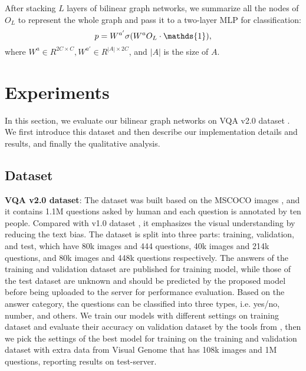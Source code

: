 \documentclass[10pt,twocolumn,letterpaper]{article}
\begin{document}
After stacking $L$ layers of bilinear graph networks, we summarize all the nodes of $O_{L}$ to represent the whole graph and pass it to a two-layer MLP for classification:
\vspace{-5pt}
\begin{equation}
p = W^{a'}\sigma(W^a O_{L} \cdot \mathds{1}),
\vspace{-5pt}
\end{equation}
where $W^a \in R^{2C \times C}, W^{a'} \in R^{|A|\times 2C}$, and $|A|$ is the size of $A$.

\section{Experiments}
In this section, we evaluate our bilinear graph networks on VQA v2.0 dataset \cite{antol2015vqa, goyal2017making}. We first introduce this dataset and then describe our implementation details and results, and finally the qualitative analysis. 

\subsection{Dataset}
\textbf{VQA v2.0 dataset}: The dataset was built based on the MSCOCO images \cite{lin2014microsoft}, and it contains 1.1M questions asked by human and each question is annotated by ten people. Compared with v1.0 dataset \cite{antol2015vqa}, it emphasizes the visual understanding by reducing the text bias. The dataset is split into three parts: training, validation, and test, which have 80k images and 444 questions, 40k images and 214k questions, and 80k images and 448k questions respectively. The answers of the training and validation dataset are published for training model, while those of the test dataset are unknown and should be predicted by the proposed model before being uploaded to the server for performance evaluation. Based on the answer category, the questions can be classified into three types, i.e. yes/no, number, and others. We train our models with different settings on training dataset and evaluate their accuracy on validation dataset by the tools from \cite{antol2015vqa}, then we pick the settings of the best model for training on the training and validation dataset with extra data from Visual Genome \cite{krishna2017visual} that has 108k images and 1M questions, reporting results on test-server.
	
\end{document}
